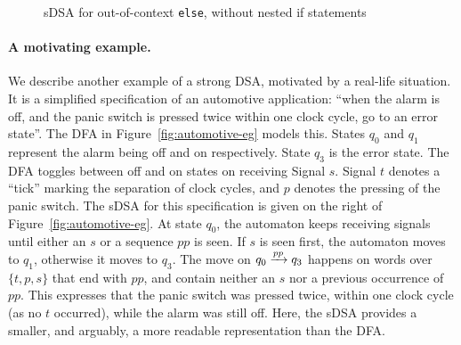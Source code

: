 \begin{figure}[t]
  \centering
  \caption{sDSA for out-of-context \texttt{else}, without nested if statements}
  \label{fig:if-else-no-nest}
\end{figure}

\paragraph*{A motivating example.} We describe another example of a strong DSA, motivated by a real-life situation. It is a simplified specification of an automotive
application: ``when the alarm is off, and the panic switch is pressed
twice within one clock cycle, go to an error state''. The DFA in
Figure~\ref{fig:automotive-eg} models this. States $q_0$ and $q_1$
represent the alarm being off and on respectively. State $q_3$ is the
error state. The DFA toggles between off and on states on receiving
Signal $s$.  Signal $t$ denotes a ``tick'' marking the separation of
clock cycles, and $p$ denotes the pressing of the panic switch. The
sDSA for this specification is given on the right of
Figure~\ref{fig:automotive-eg}. At state $q_0$, the automaton keeps
receiving signals until either an $s$ or a sequence $pp$ is seen. If
$s$ is seen first, the automaton moves to $q_1$, otherwise it moves to
$q_3$. The move on $q_0 \xrightarrow{pp} q_3$ happens on words over
$\{t, p, s\}$ that end with $pp$, and contain neither an $s$ nor a
previous occurrence of $pp$.  This expresses that the panic switch was
pressed twice, within one clock cycle (as no $t$ occurred), while the
alarm was still off. Here, the sDSA provides a smaller, and arguably, a
more readable representation than the DFA.

